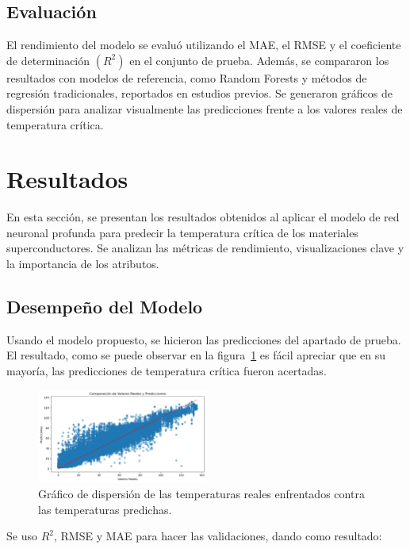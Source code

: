 \documentclass[conference]{IEEEtran} %
\begin{document}
\subsection{Evaluación}

El rendimiento del modelo se evaluó utilizando el MAE, el RMSE y 
el coeficiente de determinación $(R^2)$ en el conjunto de prueba. 
Además, se compararon los resultados con modelos de referencia, 
como Random Forests y métodos de regresión tradicionales, 
reportados en estudios previos. Se generaron gráficos de dispersión 
para analizar visualmente las predicciones frente a los valores 
reales de temperatura crítica.

\section{Resultados}

En esta sección, se presentan los resultados obtenidos al aplicar 
el modelo de red neuronal profunda para predecir la temperatura 
crítica de los materiales superconductores. Se analizan las 
métricas de rendimiento, visualizaciones clave y la importancia 
de los atributos.

\subsection{Desempeño del Modelo}

Usando el modelo propuesto, se hicieron las predicciones
del apartado de prueba. El resultado, como se puede observar en
la figura~\ref{fig:Entrenamiento} es fácil apreciar que en su mayoría,
las predicciones de temperatura crítica fueron acertadas.

\begin{figure}[!h]
    \centering
    \includegraphics[width=0.5\textwidth]{Entrenamiento.png}
    \caption{Gráfico de dispersión de las temperaturas reales enfrentados contra las temperaturas predichas.}
    \label{fig:Entrenamiento}
\end{figure}

Se uso $R^2$, RMSE y MAE para hacer las validaciones, dando como resultado:
\end{document}
